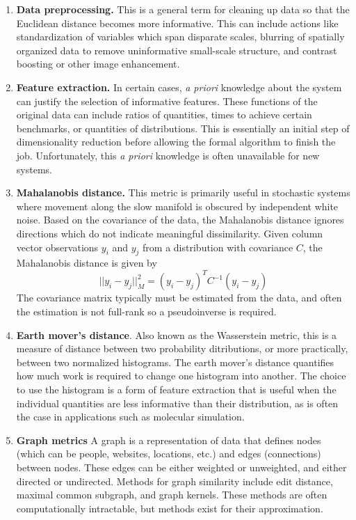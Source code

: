 \documentclass[12pt]{article}
\begin{document}
\begin{enumerate}
\item \textbf{Data preprocessing.}  This is a general term for cleaning up data so that the Euclidean distance becomes more informative. This can include actions like standardization of variables which span disparate scales, blurring of spatially organized data to remove uninformative small-scale structure, and contrast boosting or other image enhancement.
\item \textbf{Feature extraction.} In certain cases, \textit{a priori} knowledge about the system can justify the selection of informative features. These functions of the original data can include ratios of quantities, times to achieve certain benchmarks, or quantities of distributions. This is essentially an initial step of dimensionality reduction before allowing the formal algorithm to finish the job. Unfortunately, this \textit{a priori} knowledge is often unavailable for new systems.
\item \textbf{Mahalanobis distance.}  This metric is primarily useful in stochastic systems where movement along the slow manifold is obscured by independent white noise. Based on the covariance of the data, the Mahalanobis distance ignores directions which do not indicate meaningful dissimilarity. Given column vector observations $y_i$ and $y_j$ from a distribution with covariance $C$, the Mahalanobis distance is given by
\[
||y_i-y_j||^2_M = (y_i-y_j)^TC^{-1}(y_i-y_j)
\]
The covariance matrix typically must be estimated from the data, and often the estimation is not full-rank so a pseudoinverse is required.
\item \textbf{Earth mover's distance}. Also known as the Wasserstein metric, this is a measure of distance between two probability ditributions, or more practically, between two normalized histograms. The earth mover's distance quantifies how much work is required to change one histogram into another. The choice to use the histogram is a form of feature extraction that is useful when the individual quantities are less informative than their distribution, as is often the case in applications such as molecular simulation.
\item \textbf{Graph metrics} A graph is a representation of data that defines nodes (which can be people, websites, locations, etc.) and edges (connections) between nodes. These edges can be either weighted or unweighted, and either directed or undirected. Methods for graph similarity include edit distance, maximal common subgraph, and graph kernels. These methods are often computationally intractable, but methods exist for their approximation.
\end{enumerate}
\end{document}
